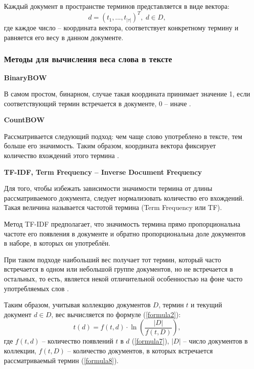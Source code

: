 Каждый документ в пространстве терминов представляется в виде вектора:
\begin{equation}
	d = \left( t_1, ..., t_{|\tau|} \right)^T, \; d \in D,
\end{equation}
где каждое число -- координата вектора, соответствует конкретному термину и равняется его весу в данном документе. \newline

\subsubsection{Методы для вычисления веса слова в тексте}\label{sec:weight}
\textbf{BinaryBOW}

В самом простом, бинарном, случае такая координата принимает значение 1, если соответствующий термин встречается в документе, 0 -- иначе \cite{auto_processing_nl_cl}. \newline

\textbf{CountBOW}

Рассматривается следующий подход: чем чаще слово употреблено в тексте, тем больше его значимость. Таким образом, координата вектора фиксирует количество вхождений этого термина \cite{review}. \newline

\textbf{TF-IDF, Term Frequency -- Inverse Document Frequency}

Для того, чтобы избежать зависимости значимости термина от длины рассматриваемого документа, следует нормализовать количество его вхождений. Такая величина называется частотой термина (Term Frequency или TF).  

Метод TF-IDF предполагает, что значимость термина прямо пропорциональна частоте его появления в документе и обратно пропорциональна доле документов в наборе, в которых он употреблён.

При таком подходе наибольший вес получает тот термин, который часто встречается в одном или небольшой группе документов, но не встречается в остальных, то есть, является некой отличительной особенностью на фоне часто употребляемых слов \cite{an_information}. 

Таким образом, учитывая коллекцию документов $D$, термин $t$ и текущий документ $d \in D$, вес вычисляется по формуле (\ref{formula2}):
\begin{equation}\label{formula2}
	t(d) = f(t, d) \cdot \ln \left( \frac{\left| D \right| }{f(t, D)} \right), 
\end{equation}
где $f(t, d)$ -- количество появлений $t$ в $d$ (\ref{formula7}), $\left| D \right| $ -- число документов в коллекции, $f(t, D)$ -- количество документов, в которых встречается рассматриваемый термин (\ref{formula8}).

